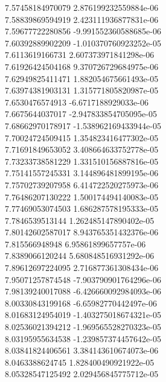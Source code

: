 {7.57458184970079 2.876199232559884e-06
 \\
7.58839869594919 2.423111936877831e-06
 \\
7.59677722280856 -9.991552360588685e-06
 \\
7.60392889902209 -1.010370760923252e-05
 \\
7.6113619166731 2.607373971841298e-06
 \\
7.61926424504168 9.370726729684975e-06
 \\
7.62949825411471 1.882054675661493e-05
 \\
7.63974381903131 1.315771805820987e-05
 \\
7.6530476574913 -6.6717188929033e-06
 \\
7.6675644037017 -2.947833854705095e-05
 \\
7.68662970178917 -1.538962169433944e-05
 \\
7.70024724509415 1.354823416477302e-05
 \\
7.71691849653052 3.408664633752778e-05
 \\
7.73233738581229 1.331510156887816e-05
 \\
7.75141557245331 3.144896481899195e-06
 \\
7.75702739207958 6.414722520275973e-06
 \\
7.76486207130222 1.500174494140083e-05
 \\
7.77469053074503 1.686287578195333e-05
 \\
7.7846539513144 1.262485147890402e-05
 \\
7.80142602587017 8.943765351432376e-06
 \\
7.815566948948 6.95861899657757e-06
 \\
7.8389066120244 5.680848516931292e-06
 \\
7.89612697224095 2.716877361308434e-06
 \\
7.95071257874548 -7.903790901764296e-06
 \\
7.98139240017088 -6.426660092984093e-06
 \\
8.00330843199168 -6.65982770442497e-06
 \\
8.01683124954019 -1.403275018674321e-05
 \\
8.02536021394212 -1.969565528270323e-05
 \\
8.03195955634538 -1.239857374457642e-05
 \\
8.03841824406561 3.384143610674073e-06
 \\
8.0463388624745 1.828400490921922e-05
 \\
8.05328547125492 2.029456845775712e-05
}

